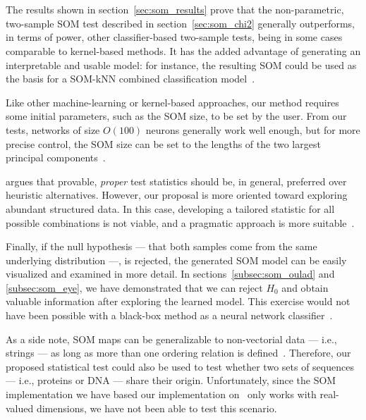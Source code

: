 \section{}
\label{sec:discuss_som}
The results shown in section~\ref{sec:som_results} prove that the non-parametric,
two-sample \gls{SOM} test described in section~\ref{sec:som_chi2} generally outperforms,
in terms of power, other classifier-based two-sample tests, being in some cases
comparable to kernel-based methods. It has the added advantage of generating an
interpretable and usable model: for instance, the resulting \gls{SOM} could be used
as the basis for a SOM-kNN combined classification model~\cite{silva2011som}.

Like other machine-learning or kernel-based approaches, our method requires some
initial parameters, such as the \gls{SOM}  size, to be set by the user. From our
tests, networks of size $O(100)$ neurons generally work well enough, but for more
precise control, the \gls{SOM} size can be set to the lengths of the two largest
principal components~\cite{KOHONEN201352}.

\cite{rosenblatt2021better} argues that provable, \emph{proper} test statistics
should be, in general, preferred over heuristic alternatives. However, our
proposal is more oriented toward exploring abundant structured data. In this
case, developing a tailored statistic for all possible combinations is not viable,
and a pragmatic approach is more suitable~\cite{kim2021classification}.

Finally, if the null hypothesis --- that both samples come from the same underlying
distribution ---, is rejected, the generated \gls{SOM}  model can be easily visualized
and examined in more detail.
In sections~\ref{subsec:som_oulad} and \ref{subsec:som_eye}, we have demonstrated
that we can reject $H_0$ and obtain valuable information after exploring the learned model. This exercise would not have been possible with a black-box
method as a neural network classifier~\cite{friedman2004multivariate}.


As a side note, \gls{SOM}  maps can be generalizable to non-vectorial data
--- i.e., strings --- as long as more than one ordering relation is defined~\cite{kohonen1982self, KOHONEN201352}.
Therefore, our proposed statistical test could also be used to test whether
two sets of sequences --- i.e., proteins or DNA --- share their origin.
Unfortunately, since the \gls{SOM} implementation we have based our implementation
on~\cite{wittek2013somoclu} only works with real-valued dimensions, we have not been
able to test this scenario.


